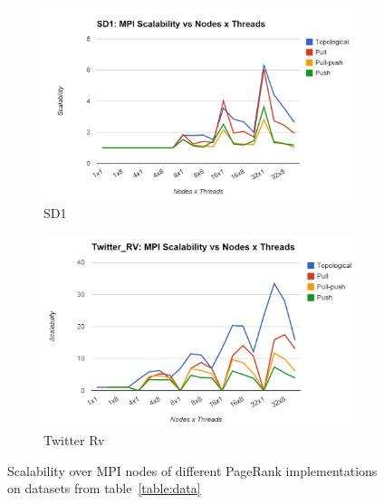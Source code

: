 \documentclass[letterpaper,11pt,onecolumn]{article}
\begin{document}
\begin{appendices}
\begin{figure}[!h]
\begin{subfigure}{.5\textwidth}
  \centering
  \includegraphics[width=.99\linewidth]{SD1MPIScalability}
  \caption{SD1}
  \label{fig:lgtime}
\end{subfigure}%
\begin{subfigure}{.5\textwidth}
  \centering
  \includegraphics[width=.99\linewidth]{TwitterRVMPIScalability}
  \caption{Twitter Rv}
  \label{fig:ftime}
\end{subfigure}
\caption{Scalability over MPI nodes of different PageRank implementations on datasets from table~\ref{table:data}}
\label{fig:scMPI2}
\end{figure}


\end{appendices}
\end{document}
